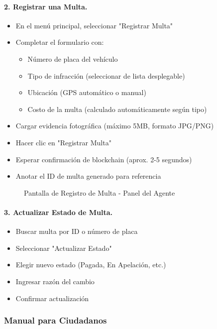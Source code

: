 \paragraph{2. Registrar una Multa.}
\begin{itemize}
    \item En el menú principal, seleccionar "Registrar Multa"
    \item Completar el formulario con:
    \begin{itemize}
        \item Número de placa del vehículo
        \item Tipo de infracción (seleccionar de lista desplegable)
        \item Ubicación (GPS automático o manual)
        \item Costo de la multa (calculado automáticamente según tipo)
    \end{itemize}
    \item Cargar evidencia fotográfica (máximo 5MB, formato JPG/PNG)
    \item Hacer clic en "Registrar Multa"
    \item Esperar confirmación de blockchain (aprox. 2-5 segundos)
    \item Anotar el ID de multa generado para referencia
\end{itemize}

\begin{figure}[htbp]
    \centering
    \caption{Pantalla de Registro de Multa - Panel del Agente}
\end{figure}

\paragraph{3. Actualizar Estado de Multa.}
\begin{itemize}
    \item Buscar multa por ID o número de placa
    \item Seleccionar "Actualizar Estado"
    \item Elegir nuevo estado (Pagada, En Apelación, etc.)
    \item Ingresar razón del cambio
    \item Confirmar actualización
\end{itemize}

\subsubsection{Manual para Ciudadanos}

